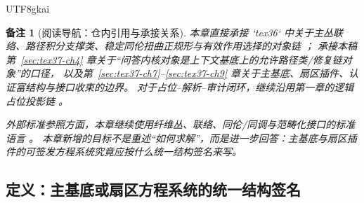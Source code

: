 \documentclass[12pt]{article}
\newtheorem{remark}{备注}[section]
\begin{document}
\begin{CJK*}{UTF8}{gkai}
\begin{remark}[阅读导航：仓内引用与承接关系]
本章直接承接 `tex36` 中关于主丛联络、路径积分支撑类、稳定同伦扭曲正规形与有效作用选择的对象链 \cite{RepoTex36HomotopyTwistBijection}；
承接本稿第~\ref{sec:tex37-ch4} 章关于“问答内核对象是上下文基底上的允许路径类/修复链对象”的口径，
以及第~\ref{sec:tex37-ch7}--\ref{sec:tex37-ch9} 章关于主基底、扇区插件、认证富结构与接口收束的边界。
对于占位--解析--审计闭环，继续沿用第一章的逻辑占位投影链 \cite{RepoTex20SemanticGaugeNormalization,RepoTex21AuditedWrapper,RepoTex23SemanticBase}。

外部标准参照方面，本章继续使用纤维丛、联络、同伦/同调与范畴化接口的标准语言 \cite{MacLane1998Categories,Hatcher2002AT,Weibel1994HomologicalAlgebra,
  KobayashiNomizu1963Foundations}。
本章新增的目标不是重述“如何求解”，而是进一步回答：主基底与扇区插件的可签发方程系统究竟应按什么统一结构签名来写。
\end{remark}

\subsection{定义：主基底或扇区方程系统的统一结构签名}
\label{subsec:tex37-ch12-def1}


\end{CJK*}
\end{document}
